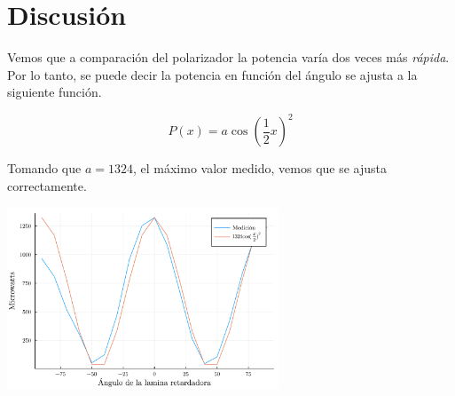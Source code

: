 \documentclass[twocolumn]{article}
\begin{document}
	\section{Discusión}
		Vemos que a comparación del polarizador la potencia varía dos veces más \emph{rápida}. Por lo tanto, se puede decir la potencia en función del ángulo se ajusta a la siguiente función.

		$$
		P(x) = a \cos(\frac{1}{2}x)^2
		$$

		Tomando que $a=1324$, el máximo valor medido, vemos que se ajusta correctamente.

		\begin{center}
			\includegraphics[width=230pt]{img/comparison.pdf}
		\end{center}
\end{document}
